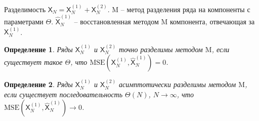 \documentclass[notheorems, handout]{beamer}
\newtheorem{definition}{Определение}
\newcommand{\TS}{\mathsf{X}}
\begin{document}
	\begin{frame}{Разделимость}
		\( \TS_N = \TS^{(1)}_N + \TS^{(2)}_N \). 
		$\mathrm M$ -- метод разделения ряда на компоненты с параметрами $\Theta$.
		$\hat{\TS}_N^{(1)}$ -- восстановленная методом $\mathrm M$ компонента, отвечающая за $\TS_N^{(1)}$. 
		\begin{definition}
			\label{def:exact}
			Ряды \( \TS^{(1)}_N \) и \( \TS^{(2)}_N \) точно разделимы методом $\mathrm M$, если существует такое \( {\Theta} \), что \( \mathrm{MSE}\left(\TS^{(1)}_N, \hat{\TS}^{(1)}_N\right) = 0 \).
		\end{definition}

		\begin{definition}
			\label{def:asymp}
			Ряды \( \TS^{(1)}_N \) и \( \TS^{(2)}_N \) асимптотически разделимы методом $\mathrm M$, если существует последовательность \( {\Theta}(N)\), \( N \rightarrow \infty \), что \( \mathrm{MSE}\left(\TS^{(1)}_N, \hat{\TS}^{(1)}_N\right) \rightarrow 0 \).
		\end{definition}

	\end{frame}
	
	
	
\end{document}
